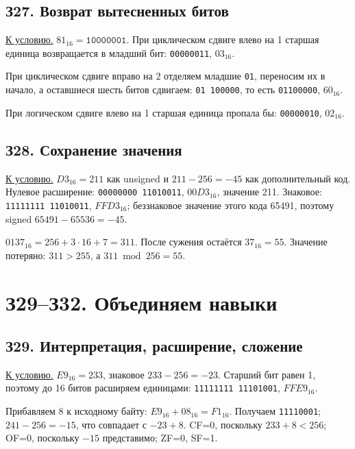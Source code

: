 \subsection*{З27. Возврат вытесненных битов}\label{sol:z27}
\hyperref[task:z27]{К условию.}
$81_{16}=\texttt{10000001}$. При циклическом сдвиге влево на 1 старшая единица возвращается в младший бит: \texttt{00000011}, $03_{16}$.

При циклическом сдвиге вправо на 2 отделяем младшие \texttt{01}, переносим их в начало, а оставшиеся шесть битов сдвигаем: \texttt{01 100000}, то есть \texttt{01100000}, $60_{16}$.

При логическом сдвиге влево на 1 старшая единица пропала бы: \texttt{00000010}, $02_{16}$.

\subsection*{З28. Сохранение значения}\label{sol:z28}
\hyperref[task:z28]{К условию.}
$D3_{16}=211$ как unsigned и $211-256=-45$ как дополнительный код.
Нулевое расширение: \texttt{00000000 11010011}, $00D3_{16}$, значение 211.
Знаковое: \texttt{11111111 11010011}, $FFD3_{16}$; беззнаковое значение этого кода 65491, поэтому signed $65491-65536=-45$.

$0137_{16}=256+3\cdot16+7=311$. После сужения остаётся $37_{16}=55$. Значение потеряно: $311>255$, а $311\bmod256=55$.

\section{З29--З32. Объединяем навыки}
\subsection*{З29. Интерпретация, расширение, сложение}\label{sol:z29}
\hyperref[task:z29]{К условию.}
$E9_{16}=233$, знаковое $233-256=-23$. Старший бит равен 1, поэтому до 16 битов расширяем единицами: \texttt{11111111 11101001}, $FFE9_{16}$.

Прибавляем 8 к исходному байту: $E9_{16}+08_{16}=F1_{16}$. Получаем \texttt{11110001}; $241-256=-15$, что совпадает с $-23+8$. CF=0, поскольку $233+8<256$; OF=0, поскольку $-15$ представимо; ZF=0, SF=1.

